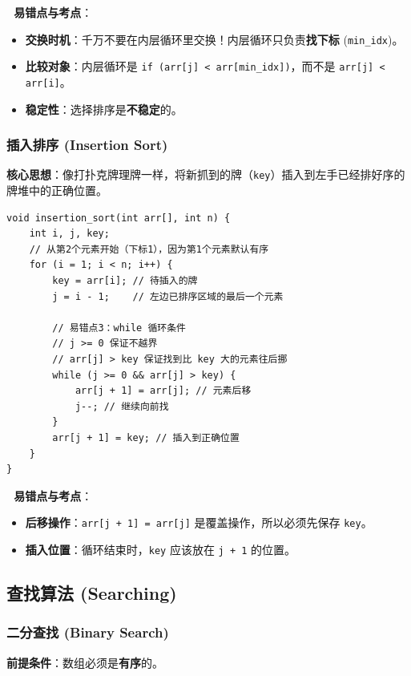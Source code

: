 \documentclass[a4paper,12pt]{article}
\begin{document}
\textbf{🔴 易错点与考点}：
\begin{itemize}
    \item \textbf{交换时机}：千万不要在内层循环里交换！内层循环只负责\textbf{找下标} (\texttt{min\_idx})。
    \item \textbf{比较对象}：内层循环是 \texttt{if (arr[j] < arr[min\_idx])}，而不是 \texttt{arr[j] < arr[i]}。
    \item \textbf{稳定性}：选择排序是\textbf{不稳定}的。
\end{itemize}

\subsubsection{插入排序 (Insertion Sort)}
\textbf{核心思想}：像打扑克牌理牌一样，将新抓到的牌（\texttt{key}）插入到左手已经排好序的牌堆中的正确位置。

\begin{lstlisting}
void insertion_sort(int arr[], int n) {
    int i, j, key;
    // 从第2个元素开始（下标1），因为第1个元素默认有序
    for (i = 1; i < n; i++) {
        key = arr[i]; // 待插入的牌
        j = i - 1;    // 左边已排序区域的最后一个元素
        
        // 易错点3：while 循环条件
        // j >= 0 保证不越界
        // arr[j] > key 保证找到比 key 大的元素往后挪
        while (j >= 0 && arr[j] > key) {
            arr[j + 1] = arr[j]; // 元素后移
            j--; // 继续向前找
        }
        arr[j + 1] = key; // 插入到正确位置
    }
}
\end{lstlisting}

\textbf{🔴 易错点与考点}：
\begin{itemize}
    \item \textbf{后移操作}：\texttt{arr[j + 1] = arr[j]} 是覆盖操作，所以必须先保存 \texttt{key}。
    \item \textbf{插入位置}：循环结束时，\texttt{key} 应该放在 \texttt{j + 1} 的位置。
\end{itemize}

\subsection{查找算法 (Searching)}

\subsubsection{二分查找 (Binary Search)}
\textbf{前提条件}：数组必须是\textbf{有序}的。
\end{document}

